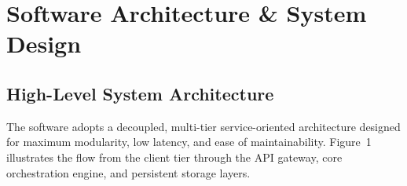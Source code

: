\documentclass[11pt, a4paper]{article}
\begin{document}
\section{Software Architecture \& System Design}

\subsection{High-Level System Architecture}
\noindent
The software adopts a decoupled, multi-tier service-oriented architecture designed for maximum modularity, low latency, and ease of maintainability. Figure~1 illustrates the flow from the client tier through the API gateway, core orchestration engine, and persistent storage layers.
\end{document}
